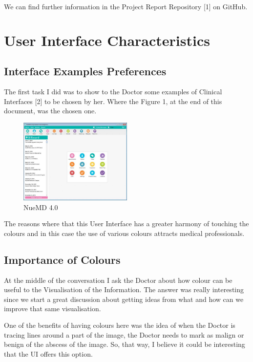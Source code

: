 We can find further information in the Project Report Repository [1] on GitHub.

\section{User Interface Characteristics}
\label{sec:examples}

\subsection{Interface Examples Preferences}

The first task I did was to show to the Doctor some examples of Clinical Interfaces [2] to be chosen by her. Where the Figure 1, at the end of this document, was the chosen one.

\begin{figure}[!hbt]
\centering
\includegraphics[width=0.5\textwidth]{nuemd-2-large.jpg}
\caption{\label{fig:frog}NueMD 4.0}
\end{figure}

The reasons where that this User Interface has a greater harmony of touching the colours and in this case the use of various colours attracts medical professionals.

\subsection{Importance of Colours}

At the middle of the conversation I ask the Doctor about how colour can be useful to the Visualisation of the Information. The answer was really interesting since we start a great discussion about getting ideas from what and how can we improve that same visualisation.

One of the benefits of having colours here was the idea of when the Doctor is tracing lines around a part of the image, the Doctor needs to mark as malign or benign of the abscess of the image. So, that way, I believe it could be interesting that the UI offers this option.

